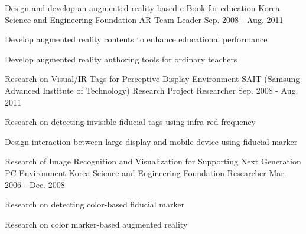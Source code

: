 \begin{cventries}
  \cventry
    {Design and develop an augmented reality based e-Book for education} %
    {Korea Science and Engineering Foundation} %
    {AR Team Leader} %
    {Sep. 2008 - Aug. 2011} %
    {
      \begin{cvitems} %
        \item {Develop augmented reality contents to enhance educational performance}
        \item {Develop augmented reality authoring tools for ordinary teachers}
      \end{cvitems}
    }

  \cventry
    {Research on Visual/IR Tags for Perceptive Display Environment} %
    {SAIT (Samsung Advanced Institute of Technology) Research Project} %
    {Researcher} %
    {Sep. 2008 - Aug. 2011} %
    {
      \begin{cvitems} %
        \item {Research on detecting invisible fiducial tags using infra-red frequency}
        \item {Design interaction between large display and mobile device using fiducial marker}
      \end{cvitems}
    }

  \cventry
    {Research of Image Recognition and Visualization for Supporting Next Generation PC Environment} %
    {Korea Science and Engineering Foundation} %
    {Researcher} %
    {Mar. 2006 - Dec. 2008} %
    {
      \begin{cvitems} %
        \item {Research on detecting color-based fiducial marker}
        \item {Research on color marker-based augmented reality}
      \end{cvitems}
    }
\end{cventries}
